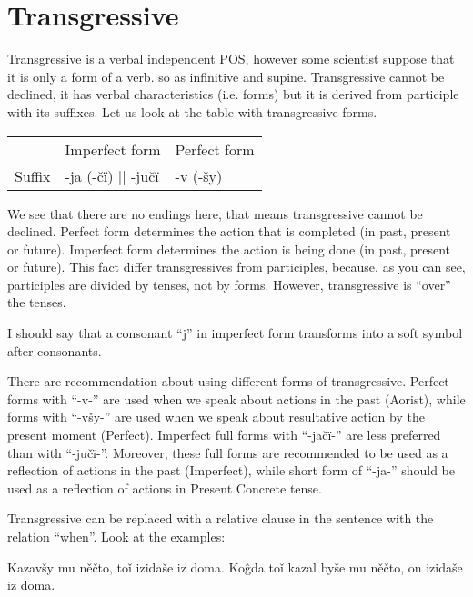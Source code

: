 \section{Transgressive}

Transgressive is a verbal independent POS, however some scientist suppose that it is only a form of a verb. so as infinitive and supine.
Transgressive cannot be declined, it has verbal characteristics (i.e. forms) but it is derived from participle with its suffixes. Let us look at the table with transgressive forms.

\begin{table}
	\begin{tabular}{lll}
		& Imperfect form & Perfect form \\
		Suffix & -ja (-čï) || -jučï & -v (-šy)
	\end{tabular}
\end{table}

We see that there are no endings here, that means transgressive cannot be declined. Perfect form determines the action that is completed (in past, present or future). Imperfect form determines the action is being done (in past, present or future). This fact differ transgressives from participles, because, as you can see, participles are divided by tenses, not by forms. However, transgressive is “over” the tenses. 

I should say that a consonant “j” in imperfect form transforms into a soft symbol after consonants. 

There are recommendation about using different forms of transgressive. Perfect forms with “-v-” are used when we speak about actions in the past (Aorist), while forms with “-všy-” are used when we speak about resultative action by the present moment (Perfect). Imperfect full forms with “-jačï-” are less preferred than with “-jučï-”. Moreover, these full forms are recommended to be used as a reflection of actions in the past (Imperfect), while short form of “-ja-” should be used as a reflection of actions in Present Concrete tense.

Transgressive can be replaced with a relative clause in the sentence with the relation “when”. Look at the examples:

Kazavšy mu něčto, toǐ izidaše iz doma.
Koĝda toǐ kazal byše mu něčto, on izidaše iz doma.
